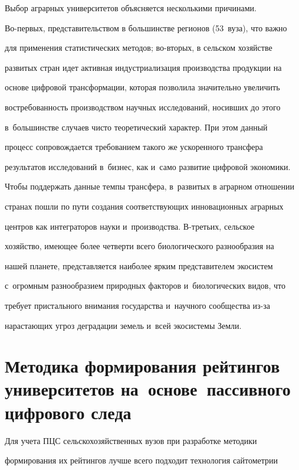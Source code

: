   


  Выбор аграрных университетов объясняется несколькими причинами.  


Во-пер\-вых, представительством в большинстве регионов (53~вуза), что важно 


для применения статистических методов; во-вто\-рых, в сельском хозяйстве 


развитых стран идет активная индустриализация производства продукции на 


основе цифровой трансформации, которая позволила значительно увеличить 


востребованность производством научных исследований, носивших до этого 


в~большинстве случаев чисто теоретический характер. При этом данный 


процесс сопровождается требованием такого же ускоренного трансфера 


результатов исследований в~бизнес, как и~само развитие цифровой экономики. 


Чтобы поддержать данные темпы трансфера, в~развитых в аграрном отношении 


странах пошли по пути создания соответствующих инновационных аграрных 


центров как интеграторов науки и~производства. В-треть\-их, сельское 


хозяйство, имеющее более четверти всего биологического разнообразия на 


нашей планете, пред\-став\-ля\-ет\-ся наиболее ярким представителем экосистем 


с~огромным разнообразием природных факторов и~биологических видов, что 


требует пристального внимания государства и~научного сообщества из-за 


на\-рас\-та\-ющих угроз деградации земель и~всей эко\-сис\-те\-мы Земли.


  


\section{Методика формирования рейтингов университетов на~основе~пассивного цифрового следа}





  Для учета ПЦС сельскохозяйственных вузов при разработке методики 


формирования их рейтингов лучше всего подходит технология сайтометрии 



